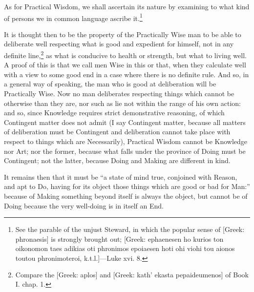 
As for Practical Wisdom, we shall ascertain its nature by examining to what
kind of persons we in common language ascribe it.\footnote{See the parable of the unjust Steward, in which the popular sense of [Greek:
phronaesis] is strongly brought out; [Greek: ephaenesen ho kurios ton oikonomon
taes adikias oti phronimos epoiaesen hoti ohi viohi tou aionos toutou
phronimoteroi, k.t.l.]—Luke xvi. 8.}

It is thought then to be the property of the Practically Wise man to be able to
deliberate well respecting what is good and expedient for himself, not in any
definite line,\footnote{Compare the [Greek: aplos] and [Greek: kath’ ekasta pepaideumenos] of
Book I. chap. 1.}
as what is conducive to health or strength, but what to living well. A proof of
this is that we call men Wise in this or that, when they calculate well with a
view to some good end in a case where there is no definite rule. And so, in a
general way of speaking, the man who is good at deliberation will be
Practically Wise. Now no man deliberates respecting things which cannot be
otherwise than they are, nor such as lie not within the range of his own
action: and so, since Knowledge requires strict demonstrative reasoning, of
which Contingent matter does not admit (I say Contingent matter, because all
matters of deliberation must be Contingent and deliberation cannot take place
with respect to things which are Necessarily), Practical Wisdom cannot be
Knowledge nor Art; nor the former, because what falls under the province of
Doing must be Contingent; not the latter, because Doing and Making are
different in kind.

It remains then that it must be “a state of mind true, conjoined with
Reason, and apt to Do, having for its object those things which are good or bad
for Man:” because of Making something beyond itself is always the object,
but cannot be of Doing because the very well-doing is in itself an End.

